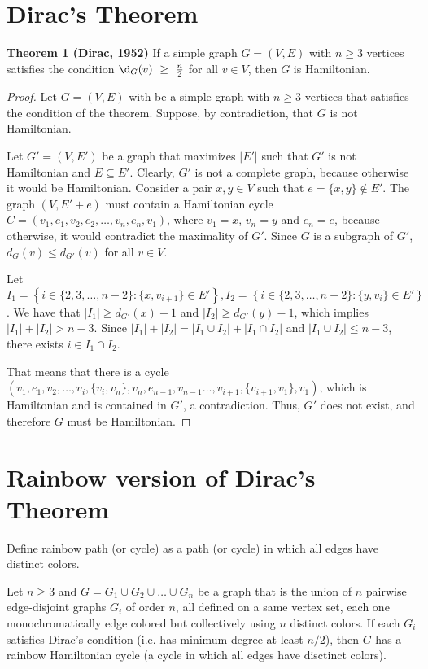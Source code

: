 \section{Dirac's Theorem}

\textbf{Theorem 1 (Dirac, 1952)} If a simple graph $G = (V, E)$ with $n \geq 3$ vertices satisfies the condition $\d_G(v)~\geq~\frac{n}{2}$ for all $v \in V$, 
then $G$ is Hamiltonian.

\begin{proof}
    Let $G = (V, E)$ with be a simple graph with $n \geq 3$ vertices that satisfies the condition of the theorem. Suppose, 
    by contradiction, that $G$ is not Hamiltonian. 

    Let $G' = (V, E')$ be a graph that maximizes $|E'|$ such that $G'$ is not Hamiltonian and $E \subseteq E'$. 
    Clearly, $G'$ is not a complete graph, because otherwise it would be Hamiltonian. Consider a pair $x, y \in V$ such that 
    $e = \{x, y\} \not\in E'$.
    The graph $(V, E' + e)$ must contain a Hamiltonian cycle $C = (v_1, e_1, v_2, e_2, \ldots, v_n, e_{n}, v_1)$, where 
    $v_1 = x$, $v_n = y$ and $e_n = e$, because otherwise, it would contradict the maximality of $G'$.
    Since $G$ is a subgraph of $G'$, $d_G(v) \leq d_{G'}(v)$ for all $v \in V$.

    Let $I_1 = \left\{i \in \{2, 3, \dots, n-2\} : \{x, v_{i+1}\} \in E'\right\}, 
    I_2 = \left\{ i \in \{2, 3, \dots, n - 2\} : \{y, v_{i}\} \in E' \right\}$.
    We have that $|I_1| \geq d_{G'}(x) - 1$ and $|I_2| \geq d_{G'}(y) - 1$,
    which implies $|I_1| + |I_2| > n - 3$. 
    Since $|I_1| + |I_2| = |I_1 \cup I_2| + |I_1 \cap I_2|$ and $|I_1 \cup I_2| \leq n - 3$, 
    there exists $i \in I_1 \cap I_2$.

    That means that there is a cycle 
    $(v_1, e_1, v_2, \dots, v_i, \{v_i, v_n\}, v_n, e_{n - 1}, v_{n-1} \dots , v_{i+1}, \{v_{i+1}, v_1\}, v_1)$, 
    which is Hamiltonian and is contained in $G'$, a contradiction. Thus, $G'$ does not exist,
    and therefore $G$ must be Hamiltonian.

\end{proof}

\section{Rainbow version of Dirac's Theorem}

Define rainbow path (or cycle) as a path (or cycle) in which all edges have distinct colors.

Let $n\geq 3$ and $G = G_1 \cup G_2 \cup \ldots \cup
G_n$ be a graph that is the union of $n$ pairwise edge-disjoint graphs
$G_i$ of order $n$, all defined on a same vertex set, each one
monochromatically edge colored but collectively using $n$ distinct
colors. If each $G_i$ satisfies Dirac's condition (i.e. has minimum 
degree at least $n/2$), then $G$ has a rainbow Hamiltonian cycle (a cycle in which all edges have
disctinct colors).
